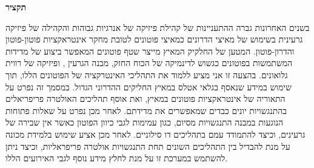 \thispagestyle{empty}

    \textbf{תקציר}

בשנים האחרונות גברה ההתעניינות של קהילת פיזיקה של אנרגיות גבוהות והקהילה של פיזיקה גרעינית בשימוש של מאיצי  הדרונים כמאיצי פוטונים לטובת מחקר אינטראקציות פוטון-פוטון והדרון-פוטון.  המטען של החלקיק המאיץ מייצר שטף פוטונים המאפשר ביצוע של מדידות המשתמשות בפוטונים כגשוש לדינמיקה של הכוח החזק, מבנה הגרעין , ופיזיקה של רווית גלואונים.  בהצעה זו אני מציע ללמוד את התהליכי האינטרקציה של הפוטונים הללו, תוך שימוש במידע שנאסף בגלאי אטלס במאיץ החליקים ההדרוני הגדול.  במסמך זה נפרט על התאוריה של אינטראקציות פוטונים במאיץ, ואת אוסף תהליכים האולטרה פריפריאלים בהתנגשויות יונים כבדים שמאפשרים את מדידתם. לאחר מכן נפרט על שאלות פתוחות הנוגעות במבנה התנגשויות מסיום, כגון עמימות לגבי כיוון הפוטון כאשר אין שבירה של גרעינים, וכיצד להתמודד עמם בתהליכים דו סילוניים. לאחר מכן אציע שימוש בלמידת מכונה על מנת להבדיל בין התהליכים השונים תחת התנגשויות אולטרה פריפראליות, וכיצד ניתן להשתמש במערכת זו על מנת לחלץ מידע נוסף לגבי האירועים הללו.

